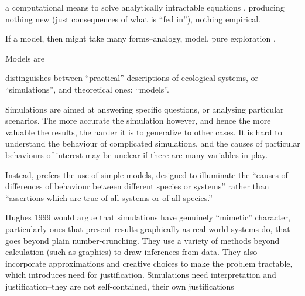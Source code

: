 \label{simulations-are-just-calculators}

a computational means to solve analytically intractable equations
\autocite[31]{Winsberg2010}, producing nothing new (just consequences
of what is ``fed in''\autocite{DiPaolo2000}), nothing empirical.


If a model, then might take many forms--analogy, model, pure exploration \autocite{Webb2009}.

Models are 

\autocite{MaynardSmith1974} distinguishes between
``practical'' descriptions of ecological systems, or ``simulations'', and
theoretical ones: ``models''.

Simulations are aimed at answering specific questions, or analysing
particular scenarios. The more accurate the simulation however, and
hence the more valuable the results, the harder it is to generalize to
other cases. It is hard to understand the behaviour of complicated
simulations, and the causes of particular behaviours of interest may be
unclear if there are many variables in play.

Instead, \autocite{MaynardSmith1974} prefers the use of simple models, designed
to illuminate the ``causes of differences of behaviour between different
species or systems'' rather than ``assertions which are true of all
systems or of all species.''

Hughes 1999 would argue that simulations have genuinely ``mimetic''
character, particularly ones that present results graphically as
real-world systems do, that goes beyond plain number-crunching. They use
a variety of methods beyond calculation (such as graphics) to draw
inferences from data. They also incorporate approximations and creative
choices to make the problem tractable, which introduces need for
justification. Simulations need interpretation and justification--they
are not self-contained, their own justifications
\autocite[31]{Winsberg2010}

